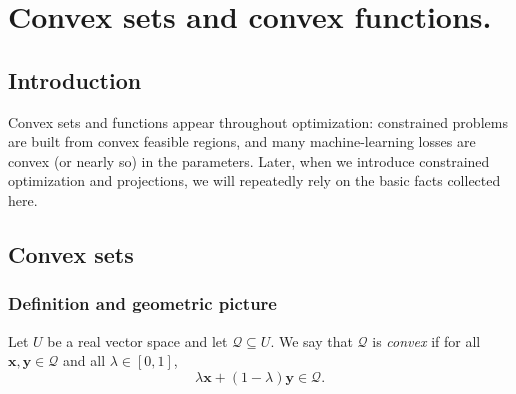 \chapter{Convex sets and convex functions.}

\graphicspath{{chapters/04_convex_set_function/figures}}
\begin{abstract}
Convexity is the structural assumption that turns many optimization problems
from ``hard in principle'' into ``tractable in practice''. In this chapter we
study: convex \emph{sets} and convex \emph{functions}.
We focus on geometric intuition, standard examples, and
closure properties (operations that preserve convexity) that let us build new
convex objects from old ones.
\end{abstract}


\section{Introduction}
Convex sets and functions appear throughout optimization: constrained problems
are built from convex feasible regions, and many machine-learning losses are
convex (or nearly so) in the parameters. Later, when we introduce constrained
optimization and projections, we will repeatedly rely on the basic facts
collected here.

\section{Convex sets}
\label{sec:ch4-convex-sets}
\subsection{Definition and geometric picture}
\begin{definition}
Let $U$ be a real vector space and let $\mathcal{Q}\subseteq U$.
We say that $\mathcal{Q}$ is \emph{convex} if for all $\mathbf{x},\mathbf{y}\in\mathcal{Q}$
and all $\lambda\in[0,1]$,
\[
  \lambda \mathbf{x}+(1-\lambda)\mathbf{y}\in\mathcal{Q}.
\]
\end{definition}


